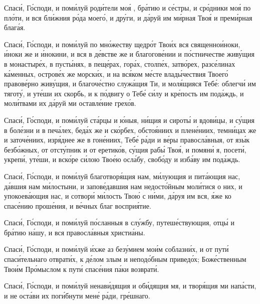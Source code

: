 \begin{mymulticols}
Спас\'{и}, Г\'{о}споди, и пом\'{и}луй род\'{и}тели мо\'{я} , бр\'{а}тию и с\'{е}стры, и ср\'{о}дники мо\'{я} по пл\'{о}ти, и вся бл\'{и}жния р\'{о}да моег\'{о}, и др\'{у}ги, и д\'{а}руй им м\'{и}рная Тво\'{я} и прем\'{и}рная благ\'{а}я. 

Спас\'{и}, Г\'{о}споди, и пом\'{и}луй по мн\'{о}жеству щедр\'{о}т Тво\'{и}х вся священно\'{и}ноки, \'{и}ноки же и \'{и}нокини, и вся в д\'{е}встве же и благогов\'{е}нии и п\'{о}стничестве жив\'{у}щия в монастыр\'{е}х, в пуст\'{ы}нях, в пещ\'{е}рах, гор\'{а}х, столп\'{е}х, затв\'{о}рех, разс\'{е}линах к\'{а}менных, остров\'{е}х же морск\'{и}х, и на вс\'{я}ком м\'{е}сте влад\'{ы}чествия Твоег\'{о} правов\'{е}рно жив\'{у}щия, и благоч\'{е}стно служ\'{а}щия Ти, и мол\'{я}щияся Теб\'{е}: облегч\'{и} им тягот\'{у}, и ут\'{е}ши их скорбь, и к п\'{о}двигу о Теб\'{е} с\'{и}лу и кр\'{е}пость им под\'{а}ждь, и мол\'{и}твами их д\'{а}руй ми оставл\'{е}ние грех\'{о}в. 

Спас\'{и}, Г\'{о}споди, и пом\'{и}луй ст\'{а}рцы и \'{ю}ныя, н\'{и}щия и сирот\'{ы} и вдов\'{и}цы, и с\'{у}щия в бол\'{е}зни и в печ\'{а}лех, бед\'{а}х же и ск\'{о}рбех, обсто\'{я}ниих и плен\'{е}ниих, темн\'{и}цах же и заточ\'{е}ниих, изр\'{я}днее же в гон\'{е}ниих, Теб\'{е} р\'{а}ди и в\'{е}ры правосл\'{а}вныя, от яз\'{ы}к безб\'{о}жных, от отст\'{у}пник и от еретик\'{о}в, с\'{у}щия раб\'{ы} Тво\'{я}, и помян\'{и} я, посет\'{и}, укреп\'{и}, ут\'{е}ши, и вск\'{о}ре с\'{и}лою Тво\'{е}ю осл\'{а}бу, своб\'{о}ду и изб\'{а}ву им под\'{а}ждь.  

Спас\'{и}, Г\'{о}споди, и пом\'{и}луй благотвор\'{я}щия нам, м\'{и}лующия и пит\'{а}ющия нас, д\'{а}вшия нам м\'{и}лостыни, и запов\'{е}давшия нам недост\'{о}йным мол\'{и}тися о них, и упокоев\'{а}ющия нас, и сотвор\'{и} м\'{и}лость Тво\'{ю} с н\'{и}ми, д\'{а}руя им вся, \'{я}же ко спас\'{е}нию прош\'{е}ния, и в\'{е}чных благ воспри\'{я}тие. 

Спас\'{и}, Г\'{о}споди, и пом\'{и}луй п\'{о}сланныя в сл\'{у}жбу, путеш\'{е}ствующия, отц\'{ы} и бр\'{а}тию н\'{а}шу, и вся правосл\'{а}вныя христи\'{а}ны. 

Спас\'{и}, Г\'{о}споди, и пом\'{и}луй \'{и}хже аз без\'{у}мием мо\'{и}м соблазн\'{и}х, и от пут\'{и} спас\'{и}тельнаго отврат\'{и}х, к д\'{е}лом злым и непод\'{о}бным привед\'{о}х; Бож\'{е}ственным Тво\'{и}м Пр\'{о}мыслом к пут\'{и} спас\'{е}ния п\'{а}ки возврат\'{и}.  

Спас\'{и}, Г\'{о}споди, и пом\'{и}луй ненав\'{и}дящия и об\'{и}дящия мя, и твор\'{я}щия ми нап\'{а}сти, и не ост\'{а}ви их пог\'{и}бнути мен\'{е} р\'{а}ди, гр\'{е}шнаго. 


\end{mymulticols}
